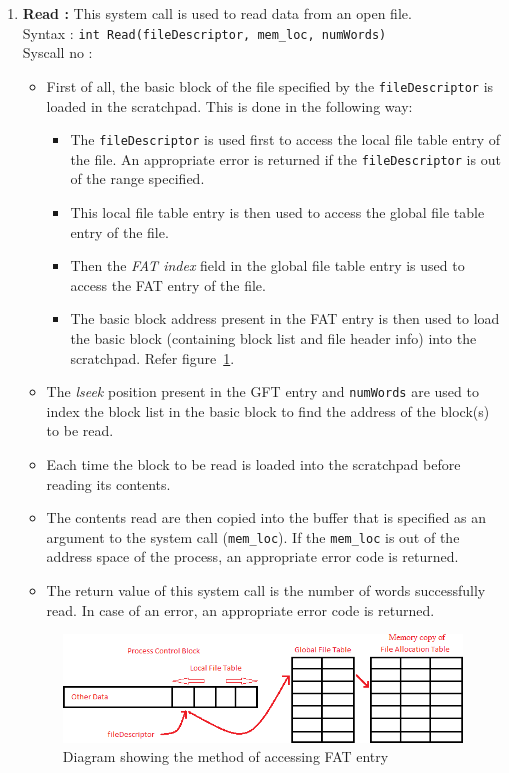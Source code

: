 \begin{enumerate}
	\item \textbf{Read :} This system call is used to read data from an open file.\\
	Syntax : \texttt{int Read(fileDescriptor, mem\_loc, numWords)} \\
	Syscall no : 
	\begin{itemize}
		\item First of all, the basic block of the file specified by the \texttt{fileDescriptor} is loaded in the scratchpad. This is done in the following way:
		\begin{itemize}
			\item The \texttt{fileDescriptor} is used first to access the local file table entry of the file. An appropriate error is returned if the \texttt{fileDescriptor} is out of the range specified.
			\item This local file table entry is then used to access the global file table entry of the file. 
			\item Then the \emph{FAT index} field in the global file table entry is used to access the FAT entry of the file.
			\item The basic block address present in the FAT entry is then used to load the basic block (containing block list and file header info) into the scratchpad. Refer figure~\ref{access_scheme}.
		\end{itemize}	
		\item The \emph{lseek} position present in the GFT entry and \texttt{numWords} are used to index the block list in the basic block to find the address of the block(s) to be read.
		\item Each time the block to be read is loaded into the scratchpad before reading its contents.
		\item The contents read are then copied into the buffer that is specified as an argument to the system call (\texttt{mem\_loc}). If the \texttt{mem\_loc} is out of the address space of the process, an appropriate error code is returned.
		\item The return value of this system call is the number of words successfully read. In case of an error, an appropriate error code is returned.
	\end{itemize}

	\begin{figure}[htp!]
		\centering
		\includegraphics[scale=0.65]{pics/access_method}
		\caption{Diagram showing the method of accessing FAT entry}
		\label{access_scheme}
	\end{figure}
\end{enumerate}
